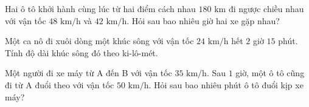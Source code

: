\begin{ex} %
Hai ô tô khởi hành cùng lúc từ hai điểm cách nhau $180\text{ km}$ đi ngược chiều nhau với vận tốc $48\text{ km/h}$ và $42\text{ km/h}$. Hỏi sau bao nhiêu giờ hai xe gặp nhau?
\end{ex}

\begin{ex} %
Một ca nô đi xuôi dòng một khúc sông với vận tốc $24\text{ km/h}$ hết $2$ giờ $15$ phút. Tính độ dài khúc sông đó theo ki-lô-mét.
\end{ex}

\begin{ex} %
Một người đi xe máy từ A đến B với vận tốc $35\text{ km/h}$. Sau $1$ giờ, một ô tô cũng đi từ A đuổi theo với vận tốc $50\text{ km/h}$. Hỏi sau bao nhiêu phút ô tô đuổi kịp xe máy?
\end{ex}
